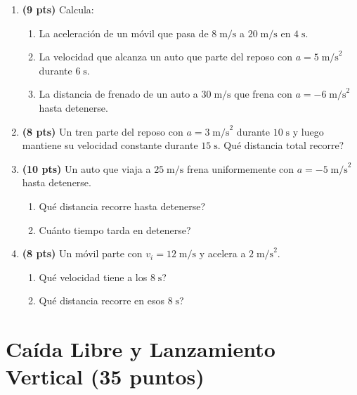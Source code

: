 \documentclass[12pt, letterpaper]{article}
\begin{document}
\begin{enumerate}[leftmargin=*]
  \item \textbf{(9 pts)} Calcula:
        \begin{enumerate}[label=\alph*)]
          \item La aceleración de un móvil que pasa de $8\;\text{m/s}$ a $20\;\text{m/s}$ en $4\;\text{s}$.
          \item La velocidad que alcanza un auto que parte del reposo con $a = 5\;\text{m/s}^2$ durante $6\;\text{s}$.
          \item La distancia de frenado de un auto a $30\;\text{m/s}$ que frena con $a = -6\;\text{m/s}^2$ hasta detenerse.
        \end{enumerate}

  \item \textbf{(8 pts)} Un tren parte del reposo con $a = 3\;\text{m/s}^2$ durante $10\;\text{s}$ y luego mantiene su velocidad constante durante $15\;\text{s}$. \textquestiondown Qué distancia total recorre?

  \item \textbf{(10 pts)} Un auto que viaja a $25\;\text{m/s}$ frena uniformemente con $a = -5\;\text{m/s}^2$ hasta detenerse.
        \begin{enumerate}[label=\alph*)]
          \item \textquestiondown Qué distancia recorre hasta detenerse?
          \item \textquestiondown Cuánto tiempo tarda en detenerse?
        \end{enumerate}

  \item \textbf{(8 pts)} Un móvil parte con $v_i = 12\;\text{m/s}$ y acelera a $2\;\text{m/s}^2$.
        \begin{enumerate}[label=\alph*)]
          \item \textquestiondown Qué velocidad tiene a los $8\;\text{s}$?
          \item \textquestiondown Qué distancia recorre en esos $8\;\text{s}$?
        \end{enumerate}
\end{enumerate}

\newpage

\section{Caída Libre y Lanzamiento Vertical (35 puntos)}
\end{document}
